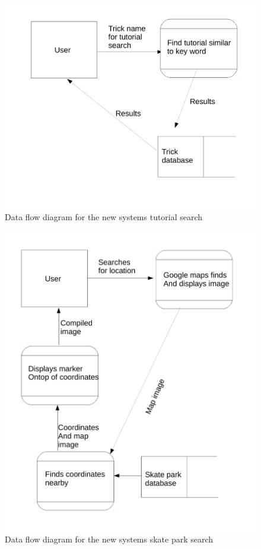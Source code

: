 \begin{figure}[H]
    \includegraphics[width=\textwidth]{./Analysis/NewTutorialSearch.pdf}
    \caption{Data flow diagram for the new systems tutorial search} \label{fig:Tutorial search}
\end{figure}



\begin{figure}[H]
    \includegraphics[width=\textwidth]{./Analysis/SkateparkSearch.pdf}
    \caption{Data flow diagram for the new systems skate park search} \label{fig:Skate park search}
\end{figure}










